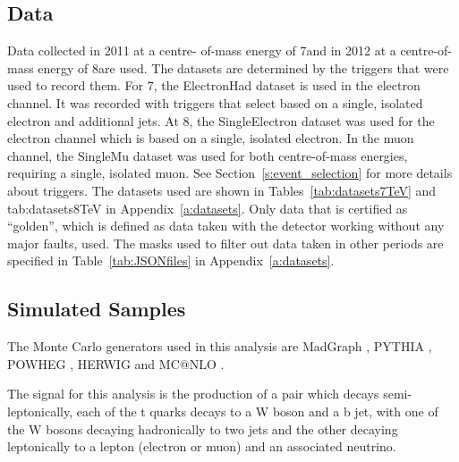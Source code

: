 \subsection{Data}
\label{ss:data}

Data collected in 2011 at a centre-  of-mass energy of 7\TeV and in 2012 at a centre-of-mass energy of
8\TeV are used. The datasets are determined by the triggers that were used to record them. For 7\TeV, the ElectronHad
dataset is used in the electron channel. It was recorded with triggers that select based on a single, isolated
electron and additional jets. At 8\TeV, the SingleElectron dataset was used for the electron channel
which is based on a single, isolated electron. In the muon channel, the SingleMu dataset was used for both
centre-of-mass energies, requiring a single, isolated muon. See Section~\ref{s:event_selection} for more
details about triggers. The datasets used are shown in Tables~\ref{tab:datasets7TeV} and {tab:datasets8TeV} in
Appendix~\ref{a:datasets}. Only data that is certified as “golden”, which is defined as data taken with the
detector working without any major faults, used. The masks used to filter out data taken in other periods are
specified in Table~\ref{tab:JSONfiles} in Appendix~\ref{a:datasets}.

\subsection{Simulated Samples}
\label{ss:simulated_samples}
The Monte Carlo generators used in this analysis are MadGraph \cite{madgraph}, PYTHIA \cite{pythia8}, POWHEG
\cite{powheg_Nason,powheg_Frixione,powheg_Alioli}, HERWIG \cite{herwig} and MC$@$NLO
\cite{mcatnlo_Frixione1, mcatnlo_Frixione2}.

The signal for this analysis is the production of a \ttbar pair which decays semi-leptonically, \ie each of
the t quarks decays to a W boson and a b jet, with one of the W bosons decaying hadronically to two jets and
the other decaying leptonically to a lepton (electron or muon) and an associated neutrino.

